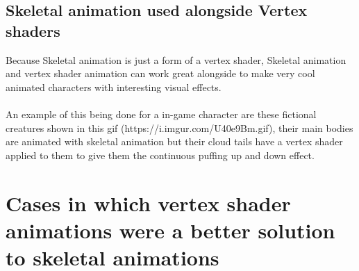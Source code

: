\documentclass{scrartcl}
\begin{document}
\subsection{Skeletal animation used alongside Vertex shaders}
Because Skeletal animation is just a form of a vertex shader, Skeletal animation and vertex shader animation can work great alongside to make very cool animated characters with interesting visual effects.
\\~\\
An example of this being done for a in-game character are these fictional creatures shown in this gif (https://i.imgur.com/U40e9Bm.gif), their main bodies are animated with skeletal animation but their cloud tails have a vertex shader applied to them to give them the continuous puffing up and down effect.

\section{Cases in which vertex shader animations were a better solution to skeletal animations}
\end{document}
